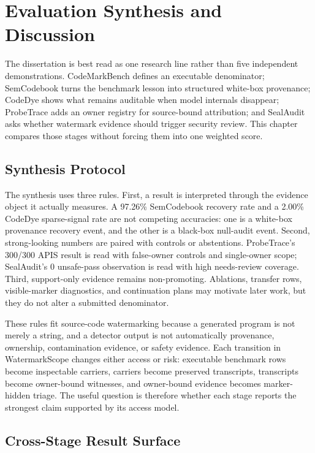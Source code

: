 \chapter{Evaluation Synthesis and Discussion}\label{cpt:discussion}

The dissertation is best read as one research line rather than five independent demonstrations. CodeMarkBench defines an executable denominator; SemCodebook turns the benchmark lesson into structured white-box provenance; CodeDye shows what remains auditable when model internals disappear; ProbeTrace adds an owner registry for source-bound attribution; and SealAudit asks whether watermark evidence should trigger security review. This chapter compares those stages without forcing them into one weighted score.

\section{Synthesis Protocol}

The synthesis uses three rules. First, a result is interpreted through the evidence object it actually measures. A 97.26\% SemCodebook recovery rate and a 2.00\% CodeDye sparse-signal rate are not competing accuracies: one is a white-box provenance recovery event, and the other is a black-box null-audit event. Second, strong-looking numbers are paired with controls or abstentions. ProbeTrace's 300/300 APIS result is read with false-owner controls and single-owner scope; SealAudit's 0 unsafe-pass observation is read with high needs-review coverage. Third, support-only evidence remains non-promoting. Ablations, transfer rows, visible-marker diagnostics, and continuation plans may motivate later work, but they do not alter a submitted denominator.

These rules fit source-code watermarking because a generated program is not merely a string, and a detector output is not automatically provenance, ownership, contamination evidence, or safety evidence. Each transition in WatermarkScope changes either access or risk: executable benchmark rows become inspectable carriers, carriers become preserved transcripts, transcripts become owner-bound witnesses, and owner-bound evidence becomes marker-hidden triage. The useful question is therefore whether each stage reports the strongest claim supported by its access model.

\section{Cross-Stage Result Surface}

